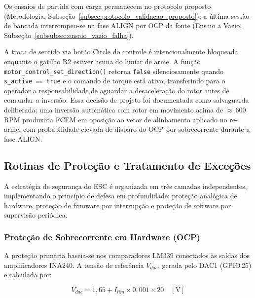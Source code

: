 Os ensaios de partida com carga permanecem no protocolo proposto (Metodologia, Subseção~\ref{subsec:protocolo_validacao_proposto}); a última sessão de bancada interrompeu-se na fase ALIGN por OCP da fonte (Ensaio a Vazio, Subseção~\ref{subsubsec:ensaio_vazio_falha}).

A troca de sentido via botão Circle do controle é intencionalmente bloqueada enquanto o gatilho R2 estiver acima do limiar de arme. A função \texttt{motor\_control\_set\_direction()} retorna \texttt{false} silenciosamente quando \texttt{s\_active == true} e o comando de torque está ativo, transferindo para o operador a responsabilidade de aguardar a desaceleração do rotor antes de comandar a inversão. Essa decisão de projeto foi documentada como salvaguarda deliberada: uma inversão automática com rotor em movimento acima de $\approx$\,600\,RPM produziria FCEM em oposição ao vetor de alinhamento aplicado no re-arme, com probabilidade elevada de disparo do OCP por sobrecorrente durante a fase ALIGN.

\subsection{Rotinas de Proteção e Tratamento de Exceções}

A estratégia de segurança do ESC é organizada em três camadas independentes, implementando o princípio de defesa em profundidade: proteção analógica de hardware, proteção de firmware por interrupção e proteção de software por supervisão periódica.

\subsubsection{Proteção de Sobrecorrente em Hardware (OCP)}

A proteção primária baseia-se nos comparadores LM339 conectados às saídas dos amplificadores INA240. A tensão de referência $V_{dac}$, gerada pelo DAC1 (GPIO\,25) e calculada por:

\begin{equation}
    V_{dac} = 1{,}65 + I_{lim} \times 0{,}001 \times 20 \quad [\text{V}]
\end{equation}

